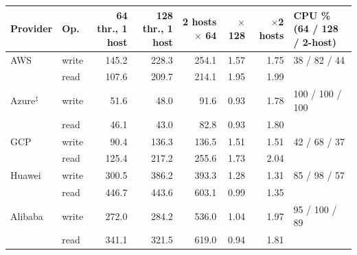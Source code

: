 \begin{tabular}{llrrrrrl}
\toprule
Provider & Op. & 64 thr., 1 host & 128 thr., 1 host & 2 hosts $\times$ 64 & $\times$128 & $\times$2 hosts & CPU \% (64 / 128 / 2-host) \\
\midrule
AWS & write & 145.2 & 228.3 & 254.1 & 1.57 & 1.75 & 38 / 82 / 44 \\
 & read & 107.6 & 209.7 & 214.1 & 1.95 & 1.99 &  \\
Azure$^{\ddagger}$ & write & 51.6 & 48.0 & 91.6 & 0.93 & 1.78 & 100 / 100 / 100 \\
 & read & 46.1 & 43.0 & 82.8 & 0.93 & 1.80 &  \\
GCP & write & 90.4 & 136.3 & 136.5 & 1.51 & 1.51 & 42 / 68 / 37 \\
 & read & 125.4 & 217.2 & 255.6 & 1.73 & 2.04 &  \\
Huawei & write & 300.5 & 386.2 & 393.3 & 1.28 & 1.31 & 85 / 98 / 57 \\
 & read & 446.7 & 443.6 & 603.1 & 0.99 & 1.35 &  \\
Alibaba & write & 272.0 & 284.2 & 536.0 & 1.04 & 1.97 & 95 / 100 / 89 \\
 & read & 341.1 & 321.5 & 619.0 & 0.94 & 1.81 &  \\
\bottomrule
\end{tabular}
